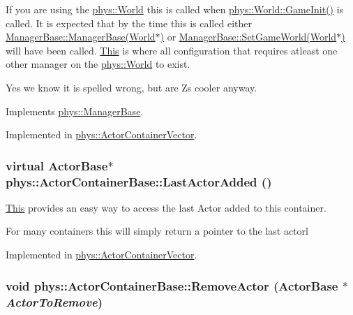 If you are using the \hyperlink{classphys_1_1World}{phys::World} this is called when \hyperlink{classphys_1_1World_a21cc36be08a61f40619584d4c438936b}{phys::World::GameInit()} is called. It is expected that by the time this is called either \hyperlink{classphys_1_1ManagerBase_ab9ad12416f771d95fe8a6d953923c634}{ManagerBase::ManagerBase(World$\ast$)} or \hyperlink{classphys_1_1ManagerBase_a97eb1e77c1f7a0925fc623836368a262}{ManagerBase::SetGameWorld(World$\ast$)} will have been called. \hyperlink{structThis}{This} is where all configuration that requires atleast one other manager on the \hyperlink{classphys_1_1World}{phys::World} to exist.\par
\par
 Yes we know it is spelled wrong, but are Zs cooler anyway. 

Implements \hyperlink{classphys_1_1ManagerBase_a57dd8e54e767427d5bdcc86dc66d73ed}{phys::ManagerBase}.



Implemented in \hyperlink{classphys_1_1ActorContainerVector_adcebf4329a587669f74e1eacc1e6912c}{phys::ActorContainerVector}.

\hypertarget{classphys_1_1ActorContainerBase_a6ccc6d058bcbbe0b9a638e28fb136477}{
\subsubsection[{LastActorAdded}]{\setlength{\rightskip}{0pt plus 5cm}virtual {\bf ActorBase}$\ast$ phys::ActorContainerBase::LastActorAdded ()}}
\label{d1/d00/classphys_1_1ActorContainerBase_a6ccc6d058bcbbe0b9a638e28fb136477}


\hyperlink{structThis}{This} provides an easy way to access the last Actor added to this container. 

For many containers this will simply return a pointer to the last actorl 

Implemented in \hyperlink{classphys_1_1ActorContainerVector_a49e643bdeff78521de9c4a9fea59a0d2}{phys::ActorContainerVector}.

\hypertarget{classphys_1_1ActorContainerBase_a579e049a3190fcc1f951b3212c209616}{
\subsubsection[{RemoveActor}]{\setlength{\rightskip}{0pt plus 5cm}void phys::ActorContainerBase::RemoveActor ({\bf ActorBase} $\ast$ {\em ActorToRemove})}}
\label{d1/d00/classphys_1_1ActorContainerBase_a579e049a3190fcc1f951b3212c209616}


